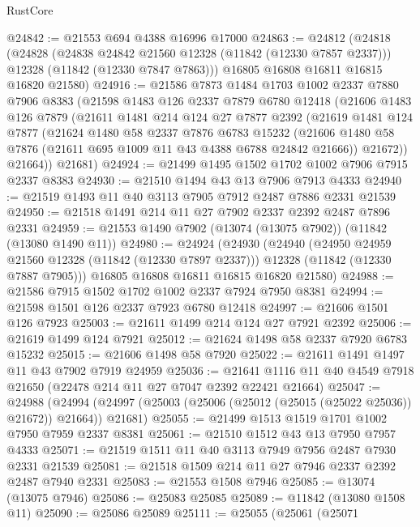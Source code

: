 \begin{lexlean}{RustCore}
\begin{coremodule}
@24842 := @21553 @694 @4388 @16996 @17000
@24863 := @24812
    (@24818
      (@24828
        (@24838 @24842 @21560 @12328 (@11842 (@12330 @7857 @2337)))
        @12328
        (@11842 (@12330 @7847 @7863)))
      @16805
      @16808
      @16811
      @16815
      @16820
      @21580)
@24916 := @21586
    @7873
    @1484
    @1703
    @1002
    @2337
    @7880
    @7906
    @8383
    (@21598
      @1483
      @126
      @2337
      @7879
      @6780
      @12418
      (@21606
        @1483
        @126
        @7879
        (@21611
          @1481
          @214
          @124
          @27
          @7877
          @2392
          (@21619
            @1481
            @124
            @7877
            (@21624
              @1480
              @58
              @2337
              @7876
              @6783
              @15232
              (@21606 @1480 @58 @7876 (@21611 @695 @1009 @11 @43 @4388 @6788 @24842 @21666))
              @21672))
          @21664))
      @21681)
@24924 := @21499 @1495 @1502 @1702 @1002 @7906 @7915 @2337 @8383
@24930 := @21510 @1494 @43 @13 @7906 @7913 @4333
@24940 := @21519 @1493 @11 @40 @3113 @7905 @7912 @2487 @7886 @2331 @21539
@24950 := @21518 @1491 @214 @11 @27 @7902 @2337 @2392 @2487 @7896 @2331
@24959 := @21553 @1490 @7902 (@13074 (@13075 @7902)) (@11842 (@13080 @1490 @11))
@24980 := @24924
    (@24930
      (@24940
        (@24950 @24959 @21560 @12328 (@11842 (@12330 @7897 @2337)))
        @12328
        (@11842 (@12330 @7887 @7905)))
      @16805
      @16808
      @16811
      @16815
      @16820
      @21580)
@24988 := @21586 @7915 @1502 @1702 @1002 @2337 @7924 @7950 @8381
@24994 := @21598 @1501 @126 @2337 @7923 @6780 @12418
@24997 := @21606 @1501 @126 @7923
@25003 := @21611 @1499 @214 @124 @27 @7921 @2392
@25006 := @21619 @1499 @124 @7921
@25012 := @21624 @1498 @58 @2337 @7920 @6783 @15232
@25015 := @21606 @1498 @58 @7920
@25022 := @21611 @1491 @1497 @11 @43 @7902 @7919 @24959
@25036 := @21641 @1116 @11 @40 @4549 @7918 @21650 (@22478 @214 @11 @27 @7047 @2392 @22421 @21664)
@25047 := @24988
    (@24994 (@24997 (@25003 (@25006 (@25012 (@25015 (@25022 @25036)) @21672)) @21664)) @21681)
@25055 := @21499 @1513 @1519 @1701 @1002 @7950 @7959 @2337 @8381
@25061 := @21510 @1512 @43 @13 @7950 @7957 @4333
@25071 := @21519 @1511 @11 @40 @3113 @7949 @7956 @2487 @7930 @2331 @21539
@25081 := @21518 @1509 @214 @11 @27 @7946 @2337 @2392 @2487 @7940 @2331
@25083 := @21553 @1508 @7946
@25085 := @13074 (@13075 @7946)
@25086 := @25083 @25085
@25089 := @11842 (@13080 @1508 @11)
@25090 := @25086 @25089
@25111 := @25055
    (@25061
      (@25071

\end{coremodule}
\end{lexlean}

